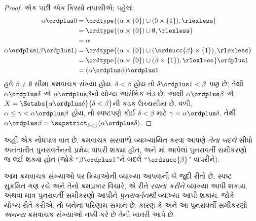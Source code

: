 \documentclass[../../../include/open-logic-section]{subfiles}
\begin{document}
\begin{proof}
એક પછી એક કિસ્સો તપાસીએ; પહેલાં:
\begin{align*}
	\alpha \ordplus  0
	& = \ordtype{(\alpha \times \{0\}) \cup (0 \times \{1\}), \rlexless} \\
	&= \ordtype{(\alpha \times \{0\}) \cup \emptyset, \rlexless}\\
	&= \alpha\\
	\alpha \ordplus (\beta \ordplus  1)
	&= \ordtype{(\alpha\times \{0\}) \cup (\ordsucc{\beta}\times \{1\}), \rlexless} \\
	&= \ordtype{(\alpha\times \{0\}) \cup (\beta \times \{1\}), \rlexless} \ordplus 1\\
	&= (\alpha \ordplus  \beta) \ordplus  1
\end{align*}
હવે $\beta \neq \emptyset$ સીમા ક્રમવાચક સંખ્યા
હોય. $\delta < \beta$ હોય તો
$\delta\ordplus 1 < \beta$ પણ છે; તેથી
$\alpha \ordplus  \delta$ એ
$\alpha \ordplus  \beta$નો યોગ્ય આરંભિક ખંડ છે.
આથી $\alpha
\ordplus  \beta$ એ
$X = \Setabs{\alpha
\ordplus  \delta}{\delta < \beta}$ની કડક ઉચ્ચસીમા
છે. વળી, $\alpha \leq \gamma <
\alpha \ordplus  \beta$ હોય, તો સ્પષ્ટપણે કોઈ
$\delta < \beta$ માટે $\gamma = \alpha \ordplus
\delta$. તેથી $\alpha \ordplus  \beta =
\supstrict_{\delta< \beta}(\alpha\ordplus \delta)$.
\end{proof}

અહીં એક નોંધપાત્ર વાત છે. ક્રમવાચક સરવાળો
વ્યાખ્યાયિત કરવા આપણે \emph{તેના બદલે} સીધો
અનંતાતીત પુનરાવર્તનનો પ્રમેય વાપરી શક્યા હોત,
અને માં આપેલાં પુનરાવર્તી
સમીકરણો જ લઈ શક્યા હોત (જોકે
``$\beta \ordplus 1$''ને બદલે
``$\ordsucc{\beta}$'' વાપરીને).

આમ ક્રમવાચક સંખ્યાઓ પર ક્રિયાઓની વ્યાખ્યા આપવાની
બે જુદી રીતો છે. સ્પષ્ટ સુક્રમિત ગણ રચે અને તેનો
ક્રમપ્રકાર વિચારે, એ રીતે \emph{રચના કરીને} વ્યાખ્યા
આપી શકાય. અથવા માત્ર પુનરાવર્તી સમીકરણો આપીને
\emph{પુનરાવર્તનથી} વ્યાખ્યા આપી શકાય. જોકે યોગ્ય
રીતે કરીએ, તો બંનેના પરિણામ સમાન છે. કારણ કે
 અને
આ પુનરાવર્તી સમીકરણો \emph{અનન્ય} ક્રમવાચક સંખ્યાઓ
નક્કી કરે છે તેની ખાતરી આપે છે.
\end{document}
